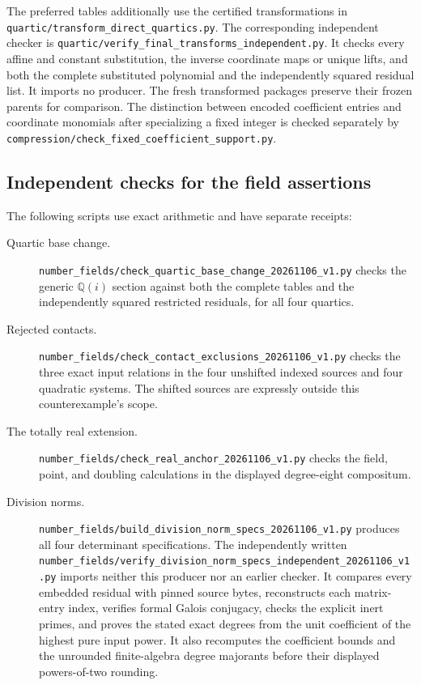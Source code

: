 \documentclass[11pt]{article}
\theoremstyle{definition}
\begin{document}
The preferred tables additionally use the certified transformations in
\nolinkurl{quartic/transform_direct_quartics.py}. The corresponding
independent checker is
\nolinkurl{quartic/verify_final_transforms_independent.py}.
It checks every affine and constant substitution, the inverse coordinate
maps or unique lifts, and both the complete substituted polynomial and
the independently squared residual list. It imports no producer. The
fresh transformed packages preserve their frozen parents for comparison.
The distinction between encoded coefficient entries and coordinate
monomials after specializing a fixed integer is checked separately by
\nolinkurl{compression/check_fixed_coefficient_support.py}.

\subsection{Independent checks for the field assertions}

The following scripts use exact arithmetic and have separate receipts:
\begin{description}
\item[Quartic base change.]
\nolinkurl{number_fields/check_quartic_base_change_20261106_v1.py}
checks the generic $\mathbb Q(i)$ section against both the complete
tables and the independently squared restricted residuals, for all
four quartics.
\item[Rejected contacts.]
\nolinkurl{number_fields/check_contact_exclusions_20261106_v1.py}
checks the three exact input relations in the four unshifted indexed
sources and four quadratic systems. The shifted sources are expressly
outside this counterexample's scope.
\item[The totally real extension.]
\nolinkurl{number_fields/check_real_anchor_20261106_v1.py}
checks the field, point, and doubling calculations in the displayed
degree-eight compositum.
\item[Division norms.]
\nolinkurl{number_fields/build_division_norm_specs_20261106_v1.py}
produces all four determinant specifications. The independently
written
\nolinkurl{number_fields/verify_division_norm_specs_independent_20261106_v1.py}
imports neither this producer nor an earlier checker. It compares
every embedded residual with pinned source bytes, reconstructs each
matrix-entry index, verifies formal Galois conjugacy, checks the
explicit inert primes, and proves the stated exact degrees from the
unit coefficient of the highest pure input power. It also recomputes
the coefficient bounds and the unrounded finite-algebra degree
majorants before their displayed powers-of-two rounding.
\end{description}
\end{document}
